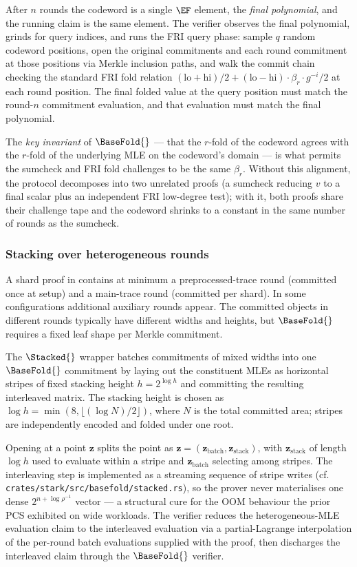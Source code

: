 After $n$ rounds the codeword is a single $\EF$ element, the \emph{final polynomial}, and the running claim is the same element. The verifier observes the final polynomial, grinds for query indices, and runs the FRI query phase: sample $q$ random codeword positions, open the original commitments and each round commitment at those positions via Merkle inclusion paths, and walk the commit chain checking the standard FRI fold relation $(\mathrm{lo} + \mathrm{hi})/2 + (\mathrm{lo} - \mathrm{hi}) \cdot \beta_r \cdot g^{-i}/2$ at each round position. The final folded value at the query position must match the round-$n$ commitment evaluation, and that evaluation must match the final polynomial.

The \emph{key invariant} of $\BaseFold{}$ — that the $r$-fold of the codeword agrees with the $r$-fold of the underlying MLE on the codeword's domain — is what permits the sumcheck and FRI fold challenges to be the same $\beta_r$. Without this alignment, the protocol decomposes into two unrelated proofs (a sumcheck reducing $v$ to a final scalar plus an independent FRI low-degree test); with it, both proofs share their challenge tape and the codeword shrinks to a constant in the same number of rounds as the sumcheck.

\subsubsection{Stacking over heterogeneous rounds}
\label{sec:basefold-stacking}

A shard proof in \Zirenver{} contains at minimum a preprocessed-trace round (committed once at setup) and a main-trace round (committed per shard). In some configurations additional auxiliary rounds appear. The committed objects in different rounds typically have different widths and heights, but $\BaseFold{}$ requires a fixed leaf shape per Merkle commitment.

The $\Stacked{}$ wrapper batches commitments of mixed widths into one $\BaseFold{}$ commitment by laying out the constituent MLEs as horizontal stripes of fixed stacking height $h = 2^{\log h}$ and committing the resulting interleaved matrix. The stacking height is chosen as $\log h = \min(8, \lfloor (\log N)/2 \rfloor)$, where $N$ is the total committed area; stripes are independently encoded and folded under one root.

Opening at a point $\bm z$ splits the point as $\bm z = (\bm z_{\text{batch}}, \bm z_{\text{stack}})$, with $\bm z_{\text{stack}}$ of length $\log h$ used to evaluate within a stripe and $\bm z_{\text{batch}}$ selecting among stripes. The interleaving step is implemented as a streaming sequence of stripe writes (cf. \texttt{crates/stark/src/basefold/stacked.rs}), so the prover never materialises one dense $2^{n + \log \rho^{-1}}$ vector — a structural cure for the OOM behaviour the prior PCS exhibited on wide workloads. The verifier reduces the heterogeneous-MLE evaluation claim to the interleaved evaluation via a partial-Lagrange interpolation of the per-round batch evaluations supplied with the proof, then discharges the interleaved claim through the $\BaseFold{}$ verifier.

